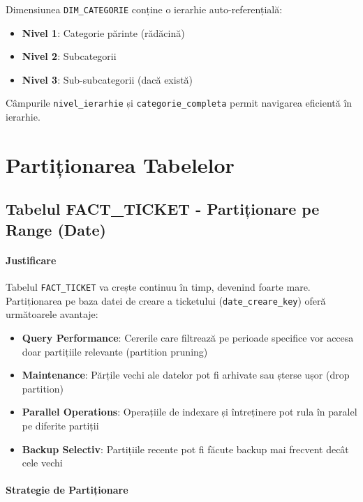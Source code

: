 Dimensiunea \texttt{DIM\_CATEGORIE} conține o ierarhie auto-referențială:
\begin{itemize}
    \item \textbf{Nivel 1}: Categorie părinte (rădăcină)
    \item \textbf{Nivel 2}: Subcategorii
    \item \textbf{Nivel 3}: Sub-subcategorii (dacă există)
\end{itemize}

Câmpurile \texttt{nivel\_ierarhie} și \texttt{categorie\_completa} permit navigarea eficientă în ierarhie.

\chapter{Partiționarea Tabelelor}
\label{sec:partitii}

\section{Tabelul FACT\_TICKET - Partiționare pe Range (Date)}

\subsubsection{Justificare}

Tabelul \texttt{FACT\_TICKET} va crește continuu în timp, devenind foarte mare. Partiționarea pe baza datei de creare a ticketului (\texttt{date\_creare\_key}) oferă următoarele avantaje:

\begin{itemize}
    \item \textbf{Query Performance}: Cererile care filtrează pe perioade specifice vor accesa doar partițiile relevante (partition pruning)
    \item \textbf{Maintenance}: Părțile vechi ale datelor pot fi arhivate sau șterse ușor (drop partition)
    \item \textbf{Parallel Operations}: Operațiile de indexare și întreținere pot rula în paralel pe diferite partiții
    \item \textbf{Backup Selectiv}: Partițiile recente pot fi făcute backup mai frecvent decât cele vechi
\end{itemize}

\subsubsection{Strategie de Partiționare}

